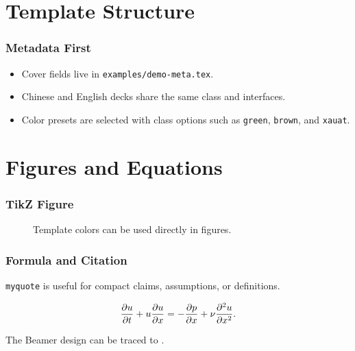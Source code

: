 \section{Template Structure}

\begin{frame}
  \frametitle{Metadata First}
  \begin{itemize}
    \item Cover fields live in \texttt{examples/demo-meta.tex}.
    \item Chinese and English decks share the same class and interfaces.
    \item Color presets are selected with class options such as \texttt{green}, \texttt{brown}, and \texttt{xauat}.
  \end{itemize}
\end{frame}

\section{Figures and Equations}

\begin{frame}
  \frametitle{TikZ Figure}
  \begin{figure}
    \centering
    \caption{Template colors can be used directly in figures.}
  \end{figure}
\end{frame}

\begin{frame}
  \frametitle{Formula and Citation}
  \begin{myquote}
    \texttt{myquote} is useful for compact claims, assumptions, or definitions.
  \end{myquote}

  \begin{equation}
    \frac{\partial u}{\partial t}+u\frac{\partial u}{\partial x}=-\frac{\partial p}{\partial x}+\nu\frac{\partial ^2u}{\partial x^2}.
  \end{equation}

  The Beamer design can be traced to \cite{tantau2004beamer}.
\end{frame}

